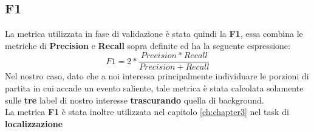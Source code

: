 \subsection{F1}
La metrica utilizzata in fase di validazione è stata quindi la \textbf{F1}, essa combina le metriche di \textbf{Precision} e \textbf{Recall} sopra definite ed ha la seguente espressione:
\begin{equation}
F1=2*\frac{Precision * Recall}{Precision + Recall}
\label{F1}
\end{equation}
Nel nostro caso, dato che a noi interessa principalmente individuare le porzioni di partita in cui accade un evento saliente, tale metrica è stata calcolata solamente sulle \textbf{tre} label di nostro interesse \textbf{trascurando} quella di background.
\\La metrica \textbf{F1} è stata inoltre utilizzata nel capitolo \ref{ch:chapter3} nel task di \textbf{localizzazione}
